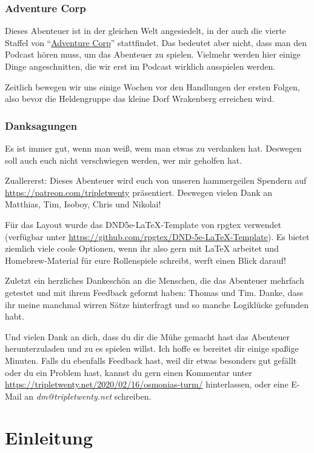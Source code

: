 \subsection{Adventure Corp}

Dieses Abenteuer ist in der gleichen Welt angesiedelt, in der auch die vierte Staffel von ``\href{https://tripletwenty.net/2020/01/07/adventure-corp-s4e01/}{Adventure Corp}'' stattfindet. Das bedeutet aber nicht, dass man den Podcast hören muss, um das Abenteuer zu spielen. Vielmehr werden hier einige Dinge angeschnitten, die wir erst im Podcast wirklich ausspielen werden.

Zeitlich bewegen wir uns einige Wochen vor den Handlungen der ersten Folgen, also bevor die Heldengruppe das kleine Dorf Wrakenberg erreichen wird.

\subsection{Danksagungen}

Es ist immer gut, wenn man weiß, wem man etwas zu verdanken hat. Deswegen soll auch euch nicht verschwiegen werden, wer mir geholfen hat.

Zuallererst: Dieses Abenteuer wird euch von unseren hammergeilen Spendern auf \url{https://patreon.com/tripletwenty} präsentiert. Deswegen vielen Dank an Matthias, Tim, Isoboy, Chris und Nikolai!

Für das Layout wurde das DND5e-LaTeX-Template von rpgtex verwendet (verfügbar unter \url{https://github.com/rpgtex/DND-5e-LaTeX-Template}). Es bietet ziemlich viele coole Optionen, wenn ihr also gern mit LaTeX arbeitet und Homebrew-Material für eure Rollenspiele schreibt, werft einen Blick darauf!

Zuletzt ein herzliches Dankeschön an die Menschen, die das Abenteuer mehrfach getestet und mit ihrem Feedback geformt haben: Thomas und Tim.
Danke, dass ihr meine manchmal wirren Sätze hinterfragt und so manche Logiklücke gefunden habt.

Und vielen Dank an dich, dass du dir die Mühe gemacht hast das Abenteuer herunterzuladen und zu es spielen willst. Ich hoffe es bereitet dir einige spaßige Minuten. Falls du ebenfalls Feedback hast, weil dir etwas besonders gut gefällt oder du ein Problem hast, kannst du gern einen Kommentar unter \url{https://tripletwenty.net/2020/02/16/osmonias-turm/} hinterlassen, oder eine E-Mail an \textit{dm@tripletwenty.net} schreiben.

\chapter*{Einleitung}

